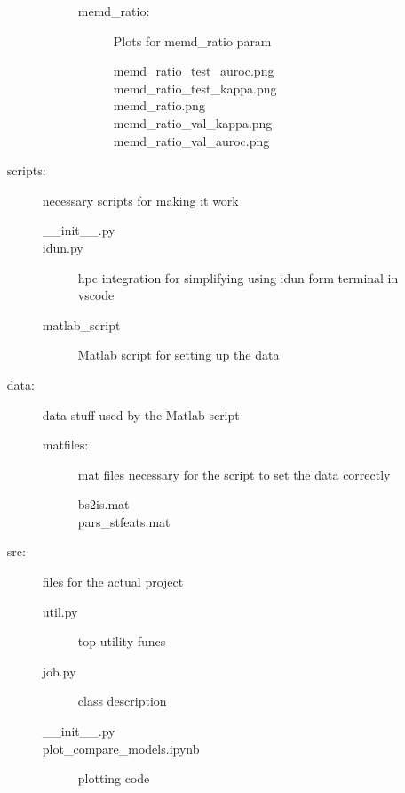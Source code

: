 \begin{footnotesize}
\begin{itemize}[label={}, leftmargin=*]
\begin{description}
\begin{description}
\begin{description}
                \item [memd\_ratio:] Plots for memd\_ratio param
                    \begin{description}
                    \item [memd\_ratio\_test\_auroc.png]
                    \item [memd\_ratio\_test\_kappa.png]
                    \item [memd\_ratio.png]
                    \item [memd\_ratio\_val\_kappa.png]
                    \item [memd\_ratio\_val\_auroc.png]
                    \end{description}
                \end{description}
            \end{description}
        \item [scripts:] necessary scripts for making it work
            \begin{description}
            \item [\_\_init\_\_.py]
            \item [idun.py] hpc integration for simplifying using idun form terminal in vscode
            \item [matlab\_script] Matlab script for setting up the data
            \end{description}
        \item [data:] data stuff used by the Matlab script
            \begin{description}
            \item [matfiles:] mat files necessary for the script to set the data correctly
                \begin{description}
                \item [bs2is.mat]
                \item [pars\_stfeats.mat]
                \end{description}
            \end{description}
        \item [src:]    files for the actual project
            \begin{description}
            \item [util.py] top utility funcs
            \item [job.py]  class description
            \item [\_\_init\_\_.py]
            \item [plot\_compare\_models.ipynb]  plotting code

\end{description}
\end{description}
\end{itemize}
\end{footnotesize}
